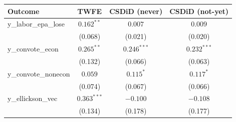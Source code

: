 \begin{tabular}{lccc}
\toprule
Outcome & TWFE & CSDiD (never) & CSDiD (not-yet) \\
\midrule
y\_labor\_epa\_lose & \(0.162^{**}\) & \(0.007\) & \(0.009\) \\
 & (0.068) & (0.021) & (0.020) \\
y\_convote\_econ & \(0.265^{**}\) & \(0.246^{***}\) & \(0.232^{***}\) \\
 & (0.132) & (0.066) & (0.063) \\
y\_convote\_nonecon & \(0.059\) & \(0.115^{*}\) & \(0.117^{*}\) \\
 & (0.074) & (0.067) & (0.066) \\
y\_ellickson\_vec & \(0.363^{***}\) & \(-0.100\) & \(-0.108\) \\
 & (0.134) & (0.178) & (0.177) \\
\bottomrule
\end{tabular}

